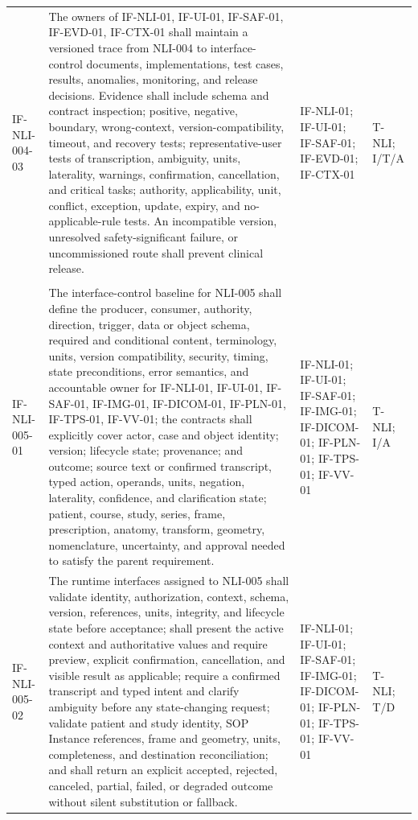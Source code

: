 \documentclass[11pt,letterpaper]{article}
\begin{document}
\begin{scriptsize}
\begin{longtable}{@{}L{0.14\textwidth}L{0.49\textwidth}L{0.19\textwidth}L{0.10\textwidth}@{}}
\addlinespace[2pt]
\mbox{IF-NLI-004-03} & The owners of IF-NLI-01, IF-UI-01, IF-SAF-01, IF-EVD-01, IF-CTX-01 shall maintain a versioned trace from NLI-004 to interface-control documents, implementations, test cases, results, anomalies, monitoring, and release decisions. Evidence shall include schema and contract inspection; positive, negative, boundary, wrong-context, version-compatibility, timeout, and recovery tests; representative-user tests of transcription, ambiguity, units, laterality, warnings, confirmation, cancellation, and critical tasks; authority, applicability, unit, conflict, exception, update, expiry, and no-applicable-rule tests. An incompatible version, unresolved safety-significant failure, or uncommissioned route shall prevent clinical release. & IF-NLI-01; IF-UI-01; IF-SAF-01; IF-EVD-01; IF-CTX-01 & T-NLI; I\slash\allowbreak{}T\slash\allowbreak{}A \\
\addlinespace[2pt]
 \\
\addlinespace[2pt]
\mbox{IF-NLI-005-01} & The interface-control baseline for NLI-005 shall define the producer, consumer, authority, direction, trigger, data or object schema, required and conditional content, terminology, units, version compatibility, security, timing, state preconditions, error semantics, and accountable owner for IF-NLI-01, IF-UI-01, IF-SAF-01, IF-IMG-01, IF-DICOM-01, IF-PLN-01, IF-TPS-01, IF-VV-01; the contracts shall explicitly cover actor, case and object identity; version; lifecycle state; provenance; and outcome; source text or confirmed transcript, typed action, operands, units, negation, laterality, confidence, and clarification state; patient, course, study, series, frame, prescription, anatomy, transform, geometry, nomenclature, uncertainty, and approval needed to satisfy the parent requirement. & IF-NLI-01; IF-UI-01; IF-SAF-01; IF-IMG-01; IF-DICOM-01; IF-PLN-01; IF-TPS-01; IF-VV-01 & T-NLI; I\slash\allowbreak{}A \\
\addlinespace[2pt]
\mbox{IF-NLI-005-02} & The runtime interfaces assigned to NLI-005 shall validate identity, authorization, context, schema, version, references, units, integrity, and lifecycle state before acceptance; shall present the active context and authoritative values and require preview, explicit confirmation, cancellation, and visible result as applicable; require a confirmed transcript and typed intent and clarify ambiguity before any state-changing request; validate patient and study identity, SOP Instance references, frame and geometry, units, completeness, and destination reconciliation; and shall return an explicit accepted, rejected, canceled, partial, failed, or degraded outcome without silent substitution or fallback. & IF-NLI-01; IF-UI-01; IF-SAF-01; IF-IMG-01; IF-DICOM-01; IF-PLN-01; IF-TPS-01; IF-VV-01 & T-NLI; T\slash\allowbreak{}D \\

\end{longtable}
\end{scriptsize}
\end{document}
